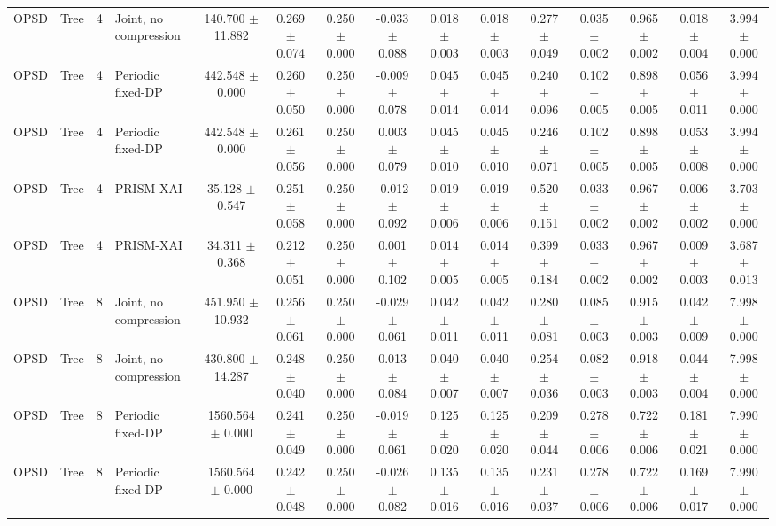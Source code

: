 \begin{table}[t]
\begin{tabular}{llllccccccccccc}
OPSD & Tree & 4 & Joint, no compression & 140.700 $\pm$ 11.882 & 0.269 $\pm$ 0.074 & 0.250 $\pm$ 0.000 & -0.033 $\pm$ 0.088 & 0.018 $\pm$ 0.003 & 0.018 $\pm$ 0.003 & 0.277 $\pm$ 0.049 & 0.035 $\pm$ 0.002 & 0.965 $\pm$ 0.002 & 0.018 $\pm$ 0.004 & 3.994 $\pm$ 0.000 \\
OPSD & Tree & 4 & Periodic fixed-DP & 442.548 $\pm$ 0.000 & 0.260 $\pm$ 0.050 & 0.250 $\pm$ 0.000 & -0.009 $\pm$ 0.078 & 0.045 $\pm$ 0.014 & 0.045 $\pm$ 0.014 & 0.240 $\pm$ 0.096 & 0.102 $\pm$ 0.005 & 0.898 $\pm$ 0.005 & 0.056 $\pm$ 0.011 & 3.994 $\pm$ 0.000 \\
OPSD & Tree & 4 & Periodic fixed-DP & 442.548 $\pm$ 0.000 & 0.261 $\pm$ 0.056 & 0.250 $\pm$ 0.000 & 0.003 $\pm$ 0.079 & 0.045 $\pm$ 0.010 & 0.045 $\pm$ 0.010 & 0.246 $\pm$ 0.071 & 0.102 $\pm$ 0.005 & 0.898 $\pm$ 0.005 & 0.053 $\pm$ 0.008 & 3.994 $\pm$ 0.000 \\
OPSD & Tree & 4 & PRISM-XAI & 35.128 $\pm$ 0.547 & 0.251 $\pm$ 0.058 & 0.250 $\pm$ 0.000 & -0.012 $\pm$ 0.092 & 0.019 $\pm$ 0.006 & 0.019 $\pm$ 0.006 & 0.520 $\pm$ 0.151 & 0.033 $\pm$ 0.002 & 0.967 $\pm$ 0.002 & 0.006 $\pm$ 0.002 & 3.703 $\pm$ 0.000 \\
OPSD & Tree & 4 & PRISM-XAI & 34.311 $\pm$ 0.368 & 0.212 $\pm$ 0.051 & 0.250 $\pm$ 0.000 & 0.001 $\pm$ 0.102 & 0.014 $\pm$ 0.005 & 0.014 $\pm$ 0.005 & 0.399 $\pm$ 0.184 & 0.033 $\pm$ 0.002 & 0.967 $\pm$ 0.002 & 0.009 $\pm$ 0.003 & 3.687 $\pm$ 0.013 \\
OPSD & Tree & 8 & Joint, no compression & 451.950 $\pm$ 10.932 & 0.256 $\pm$ 0.061 & 0.250 $\pm$ 0.000 & -0.029 $\pm$ 0.061 & 0.042 $\pm$ 0.011 & 0.042 $\pm$ 0.011 & 0.280 $\pm$ 0.081 & 0.085 $\pm$ 0.003 & 0.915 $\pm$ 0.003 & 0.042 $\pm$ 0.009 & 7.998 $\pm$ 0.000 \\
OPSD & Tree & 8 & Joint, no compression & 430.800 $\pm$ 14.287 & 0.248 $\pm$ 0.040 & 0.250 $\pm$ 0.000 & 0.013 $\pm$ 0.084 & 0.040 $\pm$ 0.007 & 0.040 $\pm$ 0.007 & 0.254 $\pm$ 0.036 & 0.082 $\pm$ 0.003 & 0.918 $\pm$ 0.003 & 0.044 $\pm$ 0.004 & 7.998 $\pm$ 0.000 \\
OPSD & Tree & 8 & Periodic fixed-DP & 1560.564 $\pm$ 0.000 & 0.241 $\pm$ 0.049 & 0.250 $\pm$ 0.000 & -0.019 $\pm$ 0.061 & 0.125 $\pm$ 0.020 & 0.125 $\pm$ 0.020 & 0.209 $\pm$ 0.044 & 0.278 $\pm$ 0.006 & 0.722 $\pm$ 0.006 & 0.181 $\pm$ 0.021 & 7.990 $\pm$ 0.000 \\
OPSD & Tree & 8 & Periodic fixed-DP & 1560.564 $\pm$ 0.000 & 0.242 $\pm$ 0.048 & 0.250 $\pm$ 0.000 & -0.026 $\pm$ 0.082 & 0.135 $\pm$ 0.016 & 0.135 $\pm$ 0.016 & 0.231 $\pm$ 0.037 & 0.278 $\pm$ 0.006 & 0.722 $\pm$ 0.006 & 0.169 $\pm$ 0.017 & 7.990 $\pm$ 0.000 \\

\end{tabular}
\end{table}
